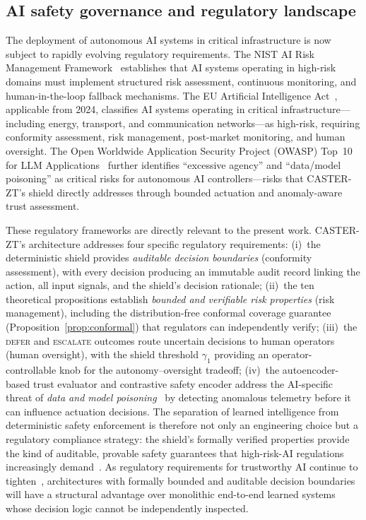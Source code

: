 \documentclass[10pt,journal,compsoc]{IEEEtran}
\begin{document}
\subsection{AI safety governance and regulatory landscape}
The deployment of autonomous AI systems in critical infrastructure is now subject to rapidly evolving regulatory requirements.
The NIST AI Risk Management Framework~\cite{nist2023airisk} establishes that AI systems operating in high-risk domains must implement structured risk assessment, continuous monitoring, and human-in-the-loop fallback mechanisms.
The EU Artificial Intelligence Act~\cite{euaiact2024}, applicable from 2024, classifies AI systems operating in critical infrastructure---including energy, transport, and communication networks---as high-risk, requiring conformity assessment, risk management, post-market monitoring, and human oversight.
The Open Worldwide Application Security Project (OWASP) Top~10 for LLM Applications~\cite{owasp2025llm} further identifies ``excessive agency'' and ``data/model poisoning'' as critical risks for autonomous AI controllers---risks that CASTER-ZT's shield directly addresses through bounded actuation and anomaly-aware trust assessment.

These regulatory frameworks are directly relevant to the present work.
CASTER-ZT's architecture addresses four specific regulatory requirements:
(i)~the deterministic shield provides \emph{auditable decision boundaries} (conformity assessment), with every decision producing an immutable audit record linking the action, all input signals, and the shield's decision rationale;
(ii)~the ten theoretical propositions establish \emph{bounded and verifiable risk properties} (risk management), including the distribution-free conformal coverage guarantee (Proposition~\ref{prop:conformal}) that regulators can independently verify;
(iii)~the \textsc{defer} and \textsc{escalate} outcomes route uncertain decisions to human operators (human oversight), with the shield threshold $\gamma_1$ providing an operator-controllable knob for the autonomy--oversight tradeoff;
(iv)~the autoencoder-based trust evaluator and contrastive safety encoder address the AI-specific threat of \emph{data and model poisoning}~\cite{owasp2025llm} by detecting anomalous telemetry before it can influence actuation decisions.
The separation of learned intelligence from deterministic safety enforcement is therefore not only an engineering choice but a regulatory compliance strategy: the shield's formally verified properties provide the kind of auditable, provable safety guarantees that high-risk-AI regulations increasingly demand~\cite{amodei2016concrete}.
As regulatory requirements for trustworthy AI continue to tighten~\cite{nist2023airisk,euaiact2024,owasp2025llm}, architectures with formally bounded and auditable decision boundaries will have a structural advantage over monolithic end-to-end learned systems whose decision logic cannot be independently inspected.
\end{document}
